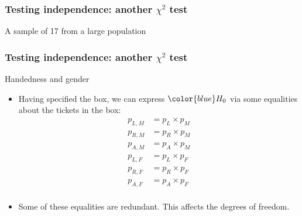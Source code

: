 \documentclass[handout]{beamer}
\begin{document}
   \begin{frame}
   \frametitle{Testing independence: another $\chi^2$ test}
   \begin{center}
   \end{center}
   A sample of 17 from a large population
   \end{frame}


   \begin{frame} \frametitle{Testing independence: another $\chi^2$ test}

   \begin{block}
     {Handedness and gender}
     \begin{itemize}
     \item Having specified the box, we can express ${\color{blue} H_0}$ via
     some equalities about the tickets in the box:
     $$
     \begin{aligned}
     p_{L,M} &= p_L \times p_M \\
     p_{R,M} &= p_R \times p_M \\
     p_{A,M} &= p_A \times p_M \\
     p_{L,F} &= p_L \times p_F \\
     p_{R,F} &= p_R \times p_F \\
     p_{A,F} &= p_A \times p_F \\
     \end{aligned}
     $$

     \item Some of these equalities are redundant. This affects the degrees of freedom.
     \end{itemize}
   \end{block}
   \end{frame}

\end{document}
